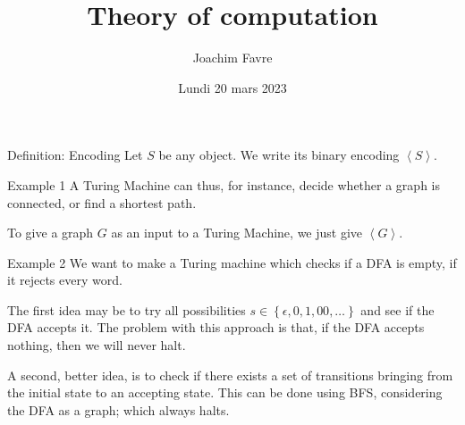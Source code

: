 \documentclass[a4paper]{article}
\title{Theory of computation}
\author{Joachim Favre}
\date{Lundi 20 mars 2023}
\begin{document}
\maketitle


\begin{parag}{Definition: Encoding}
    Let $S$ be any object. We write its binary encoding $\left\langle S \right\rangle$.
\end{parag}

\begin{parag}{Example 1}
    A Turing Machine can thus, for instance, decide whether a graph is connected, or find a shortest path.

    To give a graph $G$ as an input to a Turing Machine, we just give $\left\langle G \right\rangle$.
\end{parag}

\begin{parag}{Example 2}
    We want to make a Turing machine which checks if a DFA is empty, if it rejects every word.

    The first idea may be to try all possibilities $s \in \left\{\epsilon, 0, 1, 00, \ldots\right\}$ and see if the DFA accepts it. The problem with this approach is that, if the DFA accepts nothing, then we will never halt.

    A second, better idea, is to check if there exists a set of transitions bringing from the initial state to an accepting state. This can be done using BFS, considering the DFA as a graph; which always halts.
\end{parag}
\end{document}
